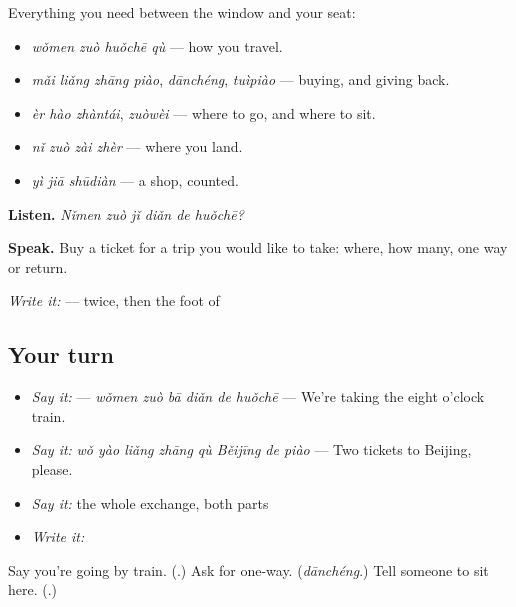 \begin{grammarlens}[title={What you've built — getting on a train}]
Everything you need between the window and your seat:

\begin{itemize}
\raggedright
  \item \textbf{} \emph{wǒmen zuò huǒchē qù} — how you travel.
  \item \emph{mǎi liǎng zhāng piào}, \emph{dānchéng}, \emph{tuìpiào} — buying, and giving back.
  \item \emph{èr hào zhàntái}, \emph{zuòwèi} — where to go, and where to sit.
  \item \textbf{} \emph{nǐ zuò zài zhèr} — where you land.
  \item \textbf{} \emph{yì jiā shūdiàn} — a shop, counted.
\end{itemize}

\textbf{Listen.} \emph{Nǐmen zuò jǐ diǎn de huǒchē?}

\textbf{Speak.} Buy a ticket for a trip you would like to take: where, how many, one way or return.

\emph{Write it:}  —  twice, then the foot of 
\end{grammarlens}

\subsection*{Your turn}
\begin{itemize}
\raggedright
  \item \emph{Say it:}  — \emph{wǒmen zuò bā diǎn de huǒchē} — We're taking the eight o'clock train.
  \item \emph{Say it:} \emph{wǒ yào liǎng zhāng qù Běijīng de piào} — Two tickets to Beijing, please.
  \item \emph{Say it:} the whole exchange, both parts
  \item \emph{Write it:} 
\end{itemize}

\begin{tcolorbox}[breakable,colback=teal!4,colframe=teal!35!black,title={Before you move on}]
Say you're going by train. (\textbf{}.) Ask for one-way. (\emph{dānchéng}.) Tell someone to sit here. (\textbf{}.)
\end{tcolorbox}
